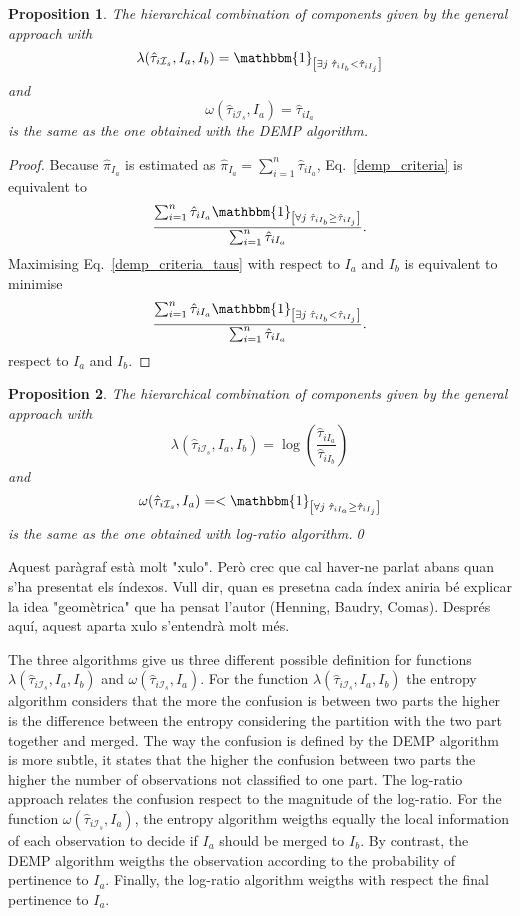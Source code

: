 \documentclass[10pt, a4paper]{article}
\newtheorem{prop}{Proposition}
\begin{document}
\begin{prop}
The hierarchical combination of components given by the general approach with
\[
\lambda(\hat{\tau}_{i \mathcal{I}_s}, I_a, I_b) = \mathbbm{1}_{\left[ \exists j\; \hat{\tau}_{i I_{b}} < \hat{\tau}_{iI_j} \right]}
\]
and
\[
\omega(\hat{\tau}_{i \mathcal{I}_s}, I_a) = \hat{\tau}_{iI_a}
\]
is the same as the one obtained with the DEMP algorithm.
\end{prop}
\begin{proof}
Because $\hat{\pi}_{I_a}$ is estimated as $\hat{\pi}_{I_a} = \sum_{i=1}^n \hat{\tau}_{iI_a}$, Eq.~\ref{demp_criteria} is equivalent to
\begin{equation}\label{demp_criteria_taus}
\frac{ \sum_{i=1}^n {\hat{\tau}_{iI_a} \mathbbm{1}_{\left[ \forall j\; \hat{\tau}_{i I_{b}} \geq \hat{\tau}_{iI_j} \right]}}}{  \sum_{i=1}^n \hat{\tau}_{iI_a}}.
\end{equation}
Maximising Eq.~\ref{demp_criteria_taus} with respect to $I_a$ and $I_b$ is equivalent to minimise
\[
\frac{ \sum_{i=1}^n {\hat{\tau}_{iI_a} \mathbbm{1}_{\left[ \exists j\; \hat{\tau}_{i I_{b}} < \hat{\tau}_{iI_j} \right]}}}{  \sum_{i=1}^n \hat{\tau}_{iI_a}}.
\]
respect to $I_a$ and $I_b$.
\end{proof}

\begin{prop}
The hierarchical combination of components given by the general approach with
\[
\lambda(\hat{\tau}_{i \mathcal{I}_s}, I_a, I_b) = \log( \frac{ \hat{\tau}_{iI_a} }{ \hat{\tau}_{iI_b} })
\]
and
\[
\omega(\hat{\tau}_{i \mathcal{I}_s}, I_a) =<\mathbbm{1}_{\left[ \forall j\; \hat{\tau}_{i I_{a}} \geq \hat{\tau}_{iI_j} \right]}
\]
is the same as the one obtained with log-ratio algorithm.\qed
\end{prop}

{\color{red} Aquest paràgraf està molt "xulo". Però crec que cal haver-ne parlat abans quan s'ha presentat els índexos. 
Vull dir, quan es presetna cada índex aniria bé explicar la idea "geomètrica" que ha pensat l'autor (Henning,  Baudry, Comas). Després aquí, aquest aparta xulo s'entendrà molt més. }


The three algorithms give us three different possible definition for functions $\lambda(\hat{\tau}_{i \mathcal{I}_s}, I_a, I_b)$ and $\omega(\hat{\tau}_{i \mathcal{I}_s}, I_a)$. For the function $\lambda(\hat{\tau}_{i \mathcal{I}_s}, I_a, I_b)$ the entropy algorithm considers that the more the confusion is between two parts the higher is the difference between the entropy considering the partition with the two part together and merged. The way the confusion is defined by the DEMP algorithm is more subtle, it states that the higher the confusion between two parts the higher the number of observations not classified to one part. The log-ratio approach relates the confusion respect to the magnitude of the log-ratio. For the function $\omega(\hat{\tau}_{i \mathcal{I}_s}, I_a)$, the entropy algorithm weigths equally the local information of each observation to decide if $I_a$ should be merged to $I_b$. By contrast, the DEMP algorithm weigths the observation according to the probability of pertinence to $I_a$. Finally, the log-ratio algorithm weigths with respect the final pertinence to $I_a$.
\end{document}
